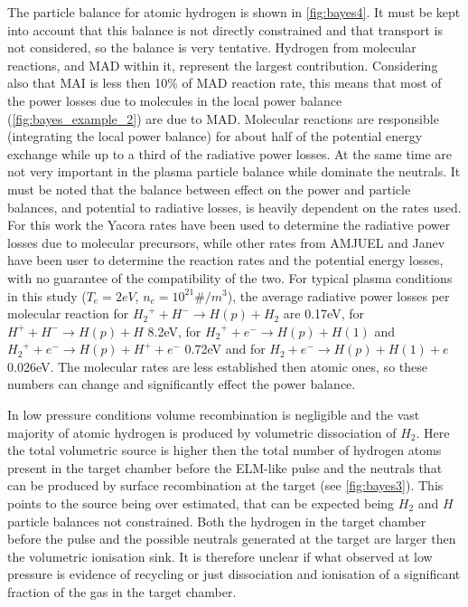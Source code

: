 The particle balance for atomic hydrogen is shown in \autoref{fig:bayes4}. It must be kept into account that this balance is not directly constrained and that transport is not considered, so the balance is very tentative. Hydrogen from molecular reactions, and MAD within it, represent the largest contribution. Considering also that MAI is less then 10\% of MAD reaction rate, this means that most of the power losses due to molecules in the local power balance (\autoref{fig:bayes_example_2}) are due to MAD. Molecular reactions are responsible (integrating the local power balance) for about half of the potential energy exchange while up to a third of the radiative power losses. At the same time are not very important in the plasma particle balance while dominate the neutrals. It must be noted that the balance between effect on the power and particle balances, and potential to radiative losses, is heavily dependent on the rates used. For this work the Yacora rates have been used to determine the radiative power losses due to molecular precursors, while other rates from AMJUEL and Janev have been user to determine the reaction rates and the potential energy losses, with no guarantee of the compatibility of the two. For typical plasma conditions in this study ($T_e=2eV$, $n_e=10^{21}\#/m^3$), the average radiative power losses per molecular reaction for ${H_2}^+ + H^- \rightarrow H(p) + H_2$ are 0.17eV, for $H^+ + H^- \rightarrow H(p) + H$ 8.2eV, for ${H_2}^+ + e^- \rightarrow H(p) + H(1)$ and ${H_2}^+ + e^- \rightarrow H(p) + H^+ + e^-$ 0.72eV and for $H_2 + e^- \rightarrow H(p) + H(1) + e$ 0.026eV. The molecular rates are less established then atomic ones, so these numbers can change and significantly effect the power balance.



In low pressure conditions volume recombination is negligible and the vast majority of atomic hydrogen is produced by volumetric dissociation of $H_2$. Here the total volumetric source is higher then the total number of hydrogen atoms present in the target chamber before the ELM-like pulse and the neutrals that can be produced by surface recombination at the target (see \autoref{fig:bayes3}). This points to the source being over estimated, that can be expected being $H_2$ and $H$ particle balances not constrained. Both the hydrogen in the target chamber before the pulse and the possible neutrals generated at the target are larger then the volumetric ionisation sink. It is therefore unclear if what observed at low pressure is evidence of recycling or just dissociation and ionisation of a significant fraction of the gas in the target chamber.

